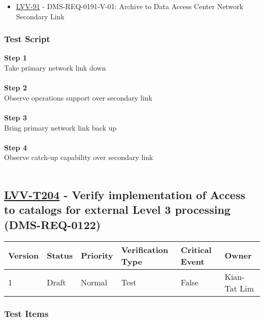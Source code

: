 \begin{itemize}
\tightlist
\item
  \href{https://jira.lsstcorp.org/browse/LVV-91}{LVV-91} -
  DMS-REQ-0191-V-01: Archive to Data Access Center Network Secondary
  Link
\end{itemize}

\hypertarget{test-script-103}{%
\subsubsection{Test Script}\label{test-script-103}}

\textbf{Step 1}\\
Take primary network link down\\
~\\
\textbf{Step 2}\\
Observe operations support over secondary link\\
~\\
\textbf{Step 3}\\
Bring primary network link back up\\
~\\
\textbf{Step 4}\\
Observe catch-up capability over secondary link\\
~\\

\hypertarget{lvv-t204---verify-implementation-of-access-to-catalogs-for-external-level-3-processing-dms-req-0122}{%
\subsection{\texorpdfstring{\href{https://jira.lsstcorp.org/secure/Tests.jspa\#/testCase/LVV-T204}{LVV-T204}
- Verify implementation of Access to catalogs for external Level 3
processing
(DMS-REQ-0122)}{LVV-T204 - Verify implementation of Access to catalogs for external Level 3 processing (DMS-REQ-0122)}}\label{lvv-t204---verify-implementation-of-access-to-catalogs-for-external-level-3-processing-dms-req-0122}}

\begin{longtable}[]{@{}llllll@{}}
\toprule
Version & Status & Priority & Verification Type & Critical Event &
Owner\tabularnewline
\midrule
\endhead
1 & Draft & Normal & Test & False & Kian-Tat Lim\tabularnewline
\bottomrule
\end{longtable}

\hypertarget{test-items-104}{%
\subsubsection{Test Items}\label{test-items-104}}

